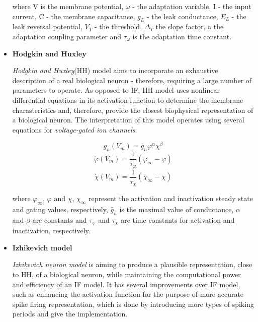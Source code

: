 \begin{itemize}
where V is the membrane potential, $\omega$ - the adaptation variable, I - the input current, C - the membrane capacitance, $g_{L}$ - the leak conductance, $E_{L}$ - the leak reversal potential, $V_{T}$ - the threshold, $\Delta_{T}$ the slope factor, a the adaptation coupling parameter and $\tau_{\omega}$ is the adaptation time constant.


\item \textbf{Hodgkin and Huxley}

\emph{Hodgkin and Huxley}(HH) model aims to incorporate an exhaustive description of a real biological neuron - therefore, requiring a large number of parameters to operate.
As opposed to IF, HH model uses nonlinear differential equations in its activation function to determine the membrane charasteristics and, therefore, provide the closest 
biophysical representation of a biological neuron.\cite{Hodgkin1952} The interpretation of this model operates using several equations for \emph{voltage-gated ion channels}:

\begin{center}
\begin{equation}g_{n}(V_{m}) = \bar{g}_{n} \varphi^{\alpha} \chi^{\beta}\end{equation}
\begin{equation}\dot{\varphi}(V_{m}) = \frac{1}{\tau_{\varphi}}(\varphi_{\infty} - \varphi)\end{equation}
\begin{equation}\dot{\chi}(V_{m}) = \frac{1}{\tau_{\chi}}(\chi_{\infty} - \chi)\end{equation}
\end{center}

where $\varphi_{\infty}$, $\varphi$ and $\chi$, $\chi_{\infty}$ represent the activation and inactivation steady state and gating values, respectively, $\bar{g}_{n}$ is the maximal value of conductance, $\alpha$ and $\beta$ are constants and $\tau_{\varphi}$ and $\tau_{\chi}$ are time constants for activation and inactivation, respectively.


\item \textbf{Izhikevich model}

\emph{Izhikevich neuron model} is aiming to produce a plausible representation, close to HH, of a biological neuron, while maintaining the computational power and efficiency of an IF model.
It has several improvements over IF model, such as enhancing the activation function for the purpose of more accurate spike firing representation, which is done by introducing more 
types of spiking periods and give the implementation.\cite{Izhikevich2003}


\end{itemize}
